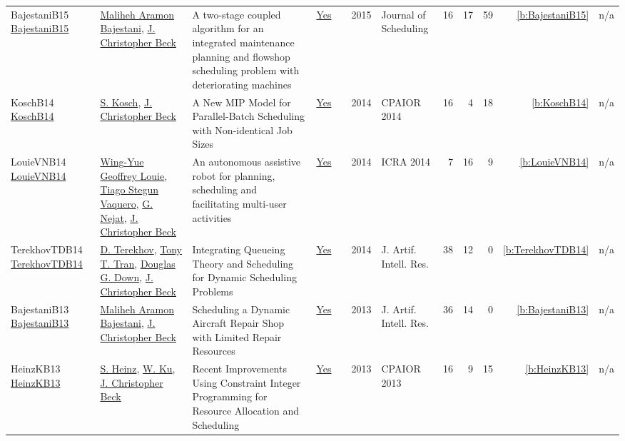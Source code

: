 {\begin{longtable}{>{\raggedright\arraybackslash}p{3cm}>{\raggedright\arraybackslash}p{6cm}>{\raggedright\arraybackslash}p{6.5cm}rrrp{2.5cm}rrrrr}
BajestaniB15 \href{https://doi.org/10.1007/s10951-015-0416-2}{BajestaniB15} & \hyperref[auth:a823]{Maliheh Aramon Bajestani}, \hyperref[auth:a89]{J. Christopher Beck} & A two-stage coupled algorithm for an integrated maintenance planning and flowshop scheduling problem with deteriorating machines & \href{../works/BajestaniB15.pdf}{Yes} & \cite{BajestaniB15} & 2015 & Journal of Scheduling & 16 & 17 & 59 & \ref{b:BajestaniB15} & n/a\\
KoschB14 \href{https://doi.org/10.1007/978-3-319-07046-9_5}{KoschB14} & \hyperref[auth:a330]{S. Kosch}, \hyperref[auth:a89]{J. Christopher Beck} & A New {MIP} Model for Parallel-Batch Scheduling with Non-identical Job Sizes & \href{../works/KoschB14.pdf}{Yes} & \cite{KoschB14} & 2014 & CPAIOR 2014 & 16 & 4 & 18 & \ref{b:KoschB14} & n/a\\
LouieVNB14 \href{https://doi.org/10.1109/ICRA.2014.6907637}{LouieVNB14} & \hyperref[auth:a825]{Wing{-}Yue Geoffrey Louie}, \hyperref[auth:a810]{Tiago Stegun Vaquero}, \hyperref[auth:a209]{G. Nejat}, \hyperref[auth:a89]{J. Christopher Beck} & An autonomous assistive robot for planning, scheduling and facilitating multi-user activities & \href{../works/LouieVNB14.pdf}{Yes} & \cite{LouieVNB14} & 2014 & ICRA 2014 & 7 & 16 & 9 & \ref{b:LouieVNB14} & n/a\\
TerekhovTDB14 \href{https://doi.org/10.1613/jair.4278}{TerekhovTDB14} & \hyperref[auth:a824]{D. Terekhov}, \hyperref[auth:a805]{Tony T. Tran}, \hyperref[auth:a809]{Douglas G. Down}, \hyperref[auth:a89]{J. Christopher Beck} & Integrating Queueing Theory and Scheduling for Dynamic Scheduling Problems & \href{../works/TerekhovTDB14.pdf}{Yes} & \cite{TerekhovTDB14} & 2014 & J. Artif. Intell. Res. & 38 & 12 & 0 & \ref{b:TerekhovTDB14} & n/a\\
BajestaniB13 \href{https://doi.org/10.1613/jair.3902}{BajestaniB13} & \hyperref[auth:a823]{Maliheh Aramon Bajestani}, \hyperref[auth:a89]{J. Christopher Beck} & Scheduling a Dynamic Aircraft Repair Shop with Limited Repair Resources & \href{../works/BajestaniB13.pdf}{Yes} & \cite{BajestaniB13} & 2013 & J. Artif. Intell. Res. & 36 & 14 & 0 & \ref{b:BajestaniB13} & n/a\\
HeinzKB13 \href{https://doi.org/10.1007/978-3-642-38171-3_2}{HeinzKB13} & \hyperref[auth:a134]{S. Heinz}, \hyperref[auth:a334]{W. Ku}, \hyperref[auth:a89]{J. Christopher Beck} & Recent Improvements Using Constraint Integer Programming for Resource Allocation and Scheduling & \href{../works/HeinzKB13.pdf}{Yes} & \cite{HeinzKB13} & 2013 & CPAIOR 2013 & 16 & 9 & 15 & \ref{b:HeinzKB13} & n/a\\

\end{longtable}}
